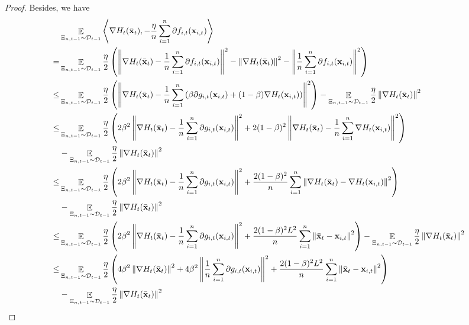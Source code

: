 \documentclass{article}
\begin{document}
\begin{proof}
Besides, we have
\begin{align}
\nonumber
& \EE_{ \Xi_{n,t-1} \sim \Dcal_{t-1} } \lrangle{\nabla H_t(\bar{\x}_t), -\frac{\eta}{n}\sum_{i=1}^n \partial f_{i,t}(\x_{i,t})} \\ \nonumber
= & \EE_{ \Xi_{n,t-1} \sim \Dcal_{t-1} } \frac{\eta}{2}\lrincir{ \lrnorm{\nabla H_t(\bar{\x}_t) -\frac{1}{n}\sum_{i=1}^n \partial f_{i,t}(\x_{i,t})}^2 - \lrnorm{\nabla H_t(\bar{\x}_t)}^2 - \lrnorm{\frac{1}{n}\sum_{i=1}^n \partial f_{i,t}(\x_{i,t})}^2 } \\ \nonumber
\le & \EE_{ \Xi_{n,t-1} \sim \Dcal_{t-1} } \frac{\eta}{2}\lrincir{ \lrnorm{\nabla H_t(\bar{\x}_t) -\frac{1}{n}\sum_{i=1}^n \lrincir{\beta \partial g_{i,t}(\x_{i,t}) + (1-\beta) \nabla H_t(\x_{i,t}) } }^2 }  - \EE_{ \Xi_{n,t-1} \sim \Dcal_{t-1} } \frac{\eta}{2} \lrnorm{\nabla H_t(\bar{\x}_t)}^2  \\ \nonumber
\le & \EE_{ \Xi_{n,t-1} \sim \Dcal_{t-1} } \frac{\eta}{2}\lrincir{ 2\beta^2 \lrnorm{\nabla H_t(\bar{\x}_t) -\frac{1}{n}\sum_{i=1}^n \partial g_{i,t}(\x_{i,t})}^2 + 2(1-\beta)^2 \lrnorm{ \nabla H_t(\bar{\x}_t) - \frac{1}{n}\sum_{i=1}^n\nabla H_t(\x_{i,t}) }^2 } \\ \nonumber 
& - \EE_{ \Xi_{n,t-1} \sim \Dcal_{t-1} } \frac{\eta}{2} \lrnorm{\nabla H_t(\bar{\x}_t)}^2  \\ \nonumber
\le & \EE_{ \Xi_{n,t-1} \sim \Dcal_{t-1} } \frac{\eta}{2}\lrincir{ 2\beta^2 \lrnorm{\nabla H_t(\bar{\x}_t) -\frac{1}{n}\sum_{i=1}^n \partial g_{i,t}(\x_{i,t})}^2 + \frac{2(1-\beta)^2}{n}\sum_{i=1}^n \lrnorm{ \nabla H_t(\bar{\x}_t) - \nabla H_t(\x_{i,t}) }^2 } \\ \nonumber 
& - \EE_{ \Xi_{n,t-1} \sim \Dcal_{t-1} } \frac{\eta}{2} \lrnorm{\nabla H_t(\bar{\x}_t)}^2  \\ \nonumber
\le & \EE_{ \Xi_{n,t-1} \sim \Dcal_{t-1} } \frac{\eta}{2}\lrincir{ 2\beta^2 \lrnorm{\nabla H_t(\bar{\x}_t) -\frac{1}{n}\sum_{i=1}^n \partial g_{i,t}(\x_{i,t})}^2 + \frac{2(1-\beta)^2L^2}{n}\sum_{i=1}^n \lrnorm{ \bar{\x}_t - \x_{i,t} }^2 }  - \EE_{ \Xi_{n,t-1} \sim \Dcal_{t-1} } \frac{\eta}{2} \lrnorm{\nabla H_t(\bar{\x}_t)}^2  \\ \nonumber
\le & \EE_{ \Xi_{n,t-1} \sim \Dcal_{t-1} } \frac{\eta}{2}\lrincir{ 4\beta^2 \lrnorm{\nabla H_t(\bar{\x}_t)}^2  + 4\beta^2 \lrnorm{\frac{1}{n}\sum_{i=1}^n \partial g_{i,t}(\x_{i,t})}^2 + \frac{2(1-\beta)^2L^2}{n}\sum_{i=1}^n \lrnorm{ \bar{\x}_t - \x_{i,t} }^2 } \\ \nonumber 
& - \EE_{ \Xi_{n,t-1} \sim \Dcal_{t-1} } \frac{\eta}{2} \lrnorm{\nabla H_t(\bar{\x}_t)}^2 \\ \label{equa_lemma_gradient_norm_temp1}

\end{align}
\end{proof}
\end{document}
